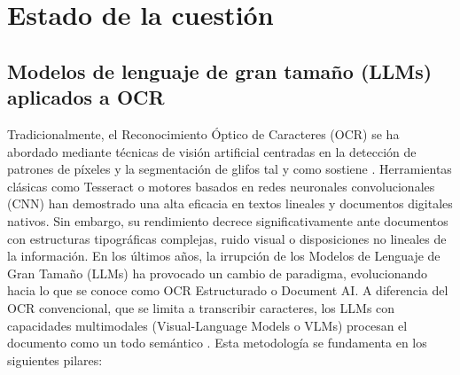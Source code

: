 
\chapter{Estado de la cuestión}

\section{Modelos de lenguaje de gran tamaño (LLMs) aplicados a OCR}

Tradicionalmente, el Reconocimiento Óptico de Caracteres (OCR) se ha abordado mediante técnicas de visión artificial centradas en la detección de patrones de píxeles y la segmentación de glifos 
tal y como sostiene \textcite{Singh2015ARO}. Herramientas clásicas como Tesseract o motores basados en redes neuronales convolucionales (CNN) han demostrado una alta eficacia en textos lineales y documentos digitales nativos. Sin embargo, su rendimiento decrece significativamente ante documentos con estructuras tipográficas complejas, ruido visual o disposiciones no lineales de la información.
En los últimos años, la irrupción de los Modelos de Lenguaje de Gran Tamaño (LLMs) ha provocado un cambio de paradigma, evolucionando hacia lo que se conoce como OCR Estructurado o Document AI. A diferencia del OCR convencional, que se limita a transcribir caracteres, los LLMs con capacidades multimodales (Visual-Language Models o VLMs) procesan el documento como un todo semántico 
\parencite{11451708}.
Esta metodología se fundamenta en los siguientes pilares:



